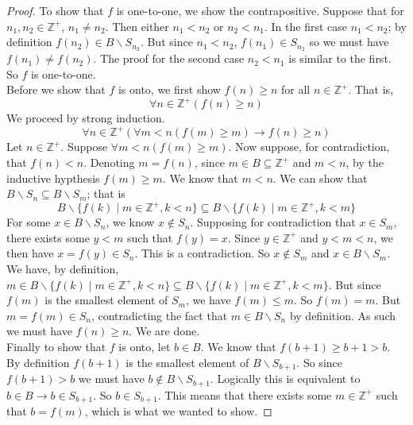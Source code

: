 \documentclass{report}
\theoremstyle{definition}
\begin{document}
\begin{proof}
\indent To show that $f$ is one-to-one, we show the contrapositive. Suppose that for $n_1,n_2\in\mathbb Z^+$, $n_1\neq n_2$.
Then either $n_1<n_2$ or $n_2<n_1$. In the first case $n_1<n_2$; by definition $f(n_2)\in B\backslash S_{n_2}$. 
But since $n_1<n_2$, $f(n_1)\in S_{n_2}$ so we must have $f(n_1)\neq f(n_2)$. 
The proof for the second case $n_2<n_1$ is similar to the first.
So $f$ is one-to-one.\\
\indent Before we show that $f$ is onto, we first show $f(n)\geq n$ for all $n\in\mathbb Z^+$. That is,
\begin{equation*}
\forall n\in\mathbb Z^+(f(n)\geq n)
\end{equation*}
We proceed by strong induction.
\begin{equation*}
\forall n\in\mathbb Z^+(\forall m<n(f(m)\geq m)\to f(n)\geq n)
\end{equation*}
Let $n\in\mathbb Z^+$. Suppose $\forall m<n(f(m)\geq m)$. Now suppose, for contradiction, that $f(n)<n$. Denoting $m=f(n)$,
since $m\in B\subseteq\mathbb Z^+$ and $m<n$, by the inductive hypthesis $f(m)\geq m$. We know that $m<n$. We can show that 
$B\backslash S_n\subseteq B\backslash S_m$; that is
\begin{equation*}
B\backslash\{f(k)\mid m\in\mathbb Z^+,k<n\}\subseteq
B\backslash\{f(k)\mid m\in\mathbb Z^+,k<m\}
\end{equation*}
For some $x\in B\backslash S_n$, we know $x\notin S_n$. Supposing for contradiction that $x\in S_m$, there exists some $y<m$ such
that $f(y)=x$. Since $y\in\mathbb Z^+$ and $y<m<n$, we then have $x=f(y)\in S_n$. This is a contradiction. So $x\notin S_m$ and
$x\in B\backslash S_m$.\\
\indent We have, by definition, $m\in B\backslash\{f(k)\mid m\in\mathbb Z^+,k<n\}\subseteq
B\backslash\{f(k)\mid m\in\mathbb Z^+,k<m\}$. But since $f(m)$ is the smallest element of $S_m$, we have $f(m)\leq m$.
So $f(m)=m$. But $m=f(m)\in S_n$, contradicting the fact that
$m\in B\backslash S_n$ by definition. As such we must have $f(n)\geq n$. We are done.\\
\indent Finally to show that $f$ is onto, let $b\in B$. 
We know that $f(b+1)\geq b+1>b$.
By definition $f(b+1)$ is the smallest element of $B\backslash S_{b+1}$. So since $f(b+1)>b$ we must have $b\notin B\backslash S_{b+1}$.
Logically this is equivalent to $b\in B\to b\in S_{b+1}$. So $b\in S_{b+1}$. This means that there exists some $m\in\mathbb Z^+$
such that $b=f(m)$, which is what we wanted to show.
\end{proof}
\end{document}
